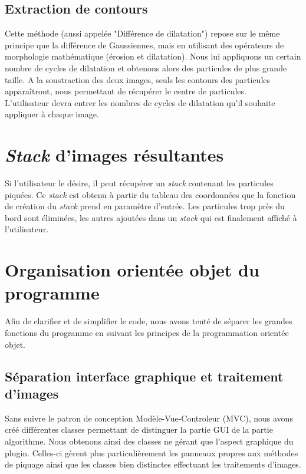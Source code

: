\subsection{Extraction de contours}

Cette méthode (aussi appelée "Différence de dilatation") repose sur le même principe que la différence de Gaussiennes, mais en utilisant des opérateurs de morphologie mathématique (érosion et dilatation). Nous lui appliquons un certain nombre de cycles de dilatation et obtenons alors des particules de plus grande taille. A la soustraction des deux images, seuls les contours des particules apparaîtront, nous permettant de récupérer le centre de particules.\\
L'utilisateur devra entrer les nombres de cycles de dilatation qu'il souhaite appliquer à chaque image.

\section{\textit{Stack} d'images résultantes}

Si l'utilisateur le désire, il peut récupérer un \textit{stack} contenant les particules piquées. Ce \textit{stack} est obtenu à partir du tableau des coordonnées que la fonction de création du \textit{stack} prend en paramètre d'entrée.
Les particules trop près du bord sont éliminées, les autres ajoutées dans un \textit{stack} qui est finalement affiché à l'utilisateur.

\section{Organisation orientée objet du programme}

Afin de clarifier et de simplifier le code, nous avons tenté de séparer les grandes fonctions du programme en suivant les principes de la programmation orientée objet.

\subsection{Séparation interface graphique et traitement d'images}

Sans suivre le patron de conception Modèle-Vue-Controleur (MVC), nous avons créé différentes classes permettant de distinguer la partie GUI de la partie algorithme. Nous obtenons ainsi des classes ne gérant que l'aspect graphique du plugin. Celles-ci gèrent plus particulièrement les panneaux propres aux méthodes de piquage ainsi que les classes bien distinctes effectuant les traitements d'images.


